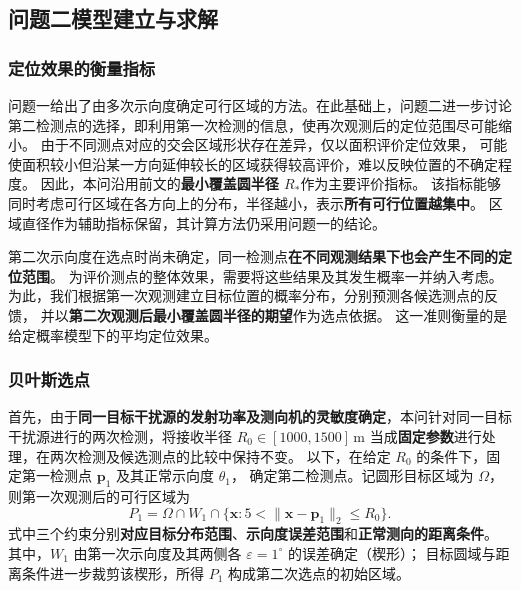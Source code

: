 \documentclass[UTF8,a4paper,12pt]{ctexart}
\begin{document}
\subsection{问题二模型建立与求解}
\label{sec:q2}

\subsubsection{定位效果的衡量指标}
\label{sec:q2-effect}

问题一给出了由多次示向度确定可行区域的方法。在此基础上，问题二进一步讨论
第二检测点的选择，即利用第一次检测的信息，使再次观测后的定位范围尽可能缩小。
由于不同测点对应的交会区域形状存在差异，仅以面积评价定位效果，
可能使面积较小但沿某一方向延伸较长的区域获得较高评价，难以反映位置的不确定程度。
因此，本问沿用前文的\textbf{最小覆盖圆半径 $R_*$}作为主要评价指标。
该指标能够同时考虑可行区域在各方向上的分布，半径越小，表示\textbf{所有可行位置越集中}。
区域直径作为辅助指标保留，其计算方法仍采用问题一的结论。

第二次示向度在选点时尚未确定，同一检测点\textbf{在不同观测结果下也会产生不同的定位范围}。
为评价测点的整体效果，需要将这些结果及其发生概率一并纳入考虑。
为此，我们根据第一次观测建立目标位置的概率分布，分别预测各候选测点的反馈，
并以\textbf{第二次观测后最小覆盖圆半径的期望}作为选点依据。
这一准则衡量的是给定概率模型下的平均定位效果。

\subsubsection{贝叶斯选点}
\label{sec:q2-bayes}

首先，由于\textbf{同一目标干扰源的发射功率及测向机的灵敏度确定}，本问针对同一目标干扰源进行的两次检测，将接收半径
$R_0\in[1000,1500]\,\mathrm m$ 当成\textbf{固定参数}进行处理，在两次检测及候选测点的比较中保持不变。
以下，在给定 $R_0$ 的条件下，固定第一检测点 $\boldsymbol p_1$ 及其正常示向度 $\theta_1$，
确定第二检测点。记圆形目标区域为 $\Omega$，则第一次观测后的可行区域为
\begin{equation}
  P_1=\Omega\cap W_1\cap
  \{\boldsymbol x:5<\|\boldsymbol x-\boldsymbol p_1\|_2\leq R_0\}.
  \label{eq:q2-first-region}
\end{equation}
式中三个约束分别\textbf{对应目标分布范围}、\textbf{示向度误差范围}和\textbf{正常测向的距离条件}。
其中，$W_1$ 由第一次示向度及其两侧各 $\varepsilon=1^\circ$ 的误差确定（楔形）；
目标圆域与距离条件进一步裁剪该楔形，所得 $P_1$ 构成第二次选点的初始区域。
\end{document}
